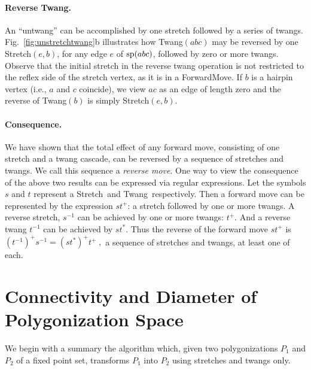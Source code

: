 \pdfoutput=1  \documentclass{article}
\def\sp{\mathop{\rm sp}\nolimits}
\def\st{{\sc Stretch}}
\def\tw{{\sc Twang}}
\def\fm{{\sc ForwardMove}}
\newcommand{\seclab}[1]{\label{sec:#1}}
\newcommand{\figref}[1]{\ref{fig:#1}}
\begin{document}
\vspace{-1.5em}
\paragraph{Reverse Twang.} An ``untwang'' can be accomplished by one stretch followed by a series
of twangs. Fig.~\figref{unstretchtwang}b illustrates how \tw$(abc)$
may be reversed by one \st$(e,b)$, for any edge $e$ of $\sp(abc)$,
followed by zero or more twangs. Observe that the initial stretch
in the reverse twang operation is not restricted to the reflex side of
the stretch vertex, as it is in a \fm. If $b$ is
a hairpin vertex (i.e., $a$ and $c$ coincide), we view $ac$ as an edge
of length zero and the reverse of \tw$(b)$ is simply \st$(e,b)$.



\vspace{-0.5em}
\paragraph{Consequence.}
We have shown that the total effect of any forward move, consisting
of one stretch and a twang cascade, can be reversed by a sequence of
stretches and twangs. We call this sequence a \emph{reverse
move}. One way to view the consequence of the above two results can
be expressed via regular expressions. Let the symbols $s$ and $t$
represent a \st\ and \tw\ respectively. Then a forward move can be
represented by the expression $s t^+$: a stretch followed by
one or more twangs. A reverse stretch, $s^{-1}$ can be achieved by one or more twangs:
$t^+$. And
a reverse twang $t^{-1}$ can be achieved by $s t^*$. Thus the
reverse of the forward move $s t^+$ is $(t^{-1})^+ s^{-1} = (s
t^*)^+ t^{+} \;,$ a sequence of stretches and twangs, at least one of each.


\vspace{-0.5em}
\section{Connectivity and Diameter of Polygonization Space}
\seclab{Connectivity}
We begin with a summary the algorithm which, given two polygonizations $P_1$
and $P_2$ of a fixed point set, transforms $P_1$ into $P_2$ using
stretches and twangs only.
\end{document}
